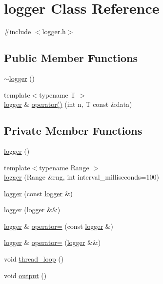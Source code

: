 \hypertarget{classyuh_1_1detail_1_1logger}{\section{logger \-Class \-Reference}
\label{d1/dce/classyuh_1_1detail_1_1logger}
}


{\ttfamily \#include $<$logger.\-h$>$}

\subsection*{\-Public \-Member \-Functions}
\begin{DoxyCompactItemize}
\item 
\hyperlink{classyuh_1_1detail_1_1logger_abc46b52b3bf194874ba4ebd9c415415a}{$\sim$logger} ()
\item 
{\footnotesize template$<$typename T $>$ }\\\hyperlink{classyuh_1_1detail_1_1logger}{logger} \& \hyperlink{classyuh_1_1detail_1_1logger_ac0b044fa4008d42252e0342a7a83461f}{operator()} (int n, \-T const \&data)
\end{DoxyCompactItemize}
\subsection*{\-Private \-Member \-Functions}
\begin{DoxyCompactItemize}
\item 
\hyperlink{classyuh_1_1detail_1_1logger_a97e3b3adabf67bc7d3650ed14214ddaa}{logger} ()
\item 
{\footnotesize template$<$typename Range $>$ }\\\hyperlink{classyuh_1_1detail_1_1logger_ab5ad71f6923679744edb73c33af936ca}{logger} (\-Range \&rng, int interval\-\_\-milliseconds=100)
\item 
\hyperlink{classyuh_1_1detail_1_1logger_a96bb29b740d2079eff2a343b96ba8fe6}{logger} (const \hyperlink{classyuh_1_1detail_1_1logger}{logger} \&)
\item 
\hyperlink{classyuh_1_1detail_1_1logger_a9a213af89763057907f1d6c5a65d9eae}{logger} (\hyperlink{classyuh_1_1detail_1_1logger}{logger} \&\&)
\item 
\hyperlink{classyuh_1_1detail_1_1logger}{logger} \& \hyperlink{classyuh_1_1detail_1_1logger_aeadd53088e5adb387e95cdcfb5301a06}{operator=} (const \hyperlink{classyuh_1_1detail_1_1logger}{logger} \&)
\item 
\hyperlink{classyuh_1_1detail_1_1logger}{logger} \& \hyperlink{classyuh_1_1detail_1_1logger_a99e78de8d2b06cf46095a56c4b607e42}{operator=} (\hyperlink{classyuh_1_1detail_1_1logger}{logger} \&\&)
\item 
void \hyperlink{classyuh_1_1detail_1_1logger_aaab9f2249ce35dc29648607974a17cc9}{thread\-\_\-loop} ()
\item 
void \hyperlink{classyuh_1_1detail_1_1logger_a7437b254e19e7e12fc2ec99945f4ecea}{output} ()
\end{DoxyCompactItemize}
